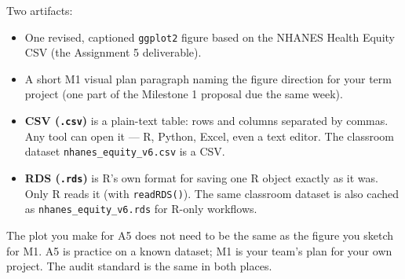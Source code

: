 \documentclass[
  letterpaper,
  DIV=11,
  numbers=noendperiod,
  oneside]{scrreprt}
\providecommand{\tightlist}{%
  \setlength{\itemsep}{0pt}\setlength{\parskip}{0pt}}
\begin{document}
Two artifacts:

\begin{itemize}
\tightlist
\item
  One revised, captioned \texttt{ggplot2} figure based on the NHANES
  Health Equity CSV (the Assignment 5 deliverable).
\item
  A short M1 visual plan paragraph naming the figure direction for your
  term project (one part of the Milestone 1 proposal due the same week).
\end{itemize}

\begin{tcolorbox}[enhanced jigsaw, title=\textcolor{quarto-callout-note-color}{\faInfo}\hspace{0.5em}{Two file formats you will keep seeing: CSV and RDS}, arc=.35mm, toptitle=1mm, colframe=quarto-callout-note-color-frame, toprule=.15mm, leftrule=.75mm, bottomtitle=1mm, opacityback=0, bottomrule=.15mm, coltitle=black, breakable, opacitybacktitle=0.6, titlerule=0mm, colback=white, left=2mm, colbacktitle=quarto-callout-note-color!10!white, rightrule=.15mm]

\begin{itemize}
\tightlist
\item
  \textbf{CSV (\texttt{.csv})} is a plain-text table: rows and columns
  separated by commas. Any tool can open it --- R, Python, Excel, even a
  text editor. The classroom dataset \texttt{nhanes\_equity\_v6.csv} is
  a CSV.
\item
  \textbf{RDS (\texttt{.rds})} is R's own format for saving one R object
  exactly as it was. Only R reads it (with \texttt{readRDS()}). The same
  classroom dataset is also cached as \texttt{nhanes\_equity\_v6.rds}
  for R-only workflows.
\end{itemize}

\end{tcolorbox}

\begin{tcolorbox}[enhanced jigsaw, title=\textcolor{quarto-callout-tip-color}{\faLightbulb}\hspace{0.5em}{Tip}, arc=.35mm, toptitle=1mm, colframe=quarto-callout-tip-color-frame, toprule=.15mm, leftrule=.75mm, bottomtitle=1mm, opacityback=0, bottomrule=.15mm, coltitle=black, breakable, opacitybacktitle=0.6, titlerule=0mm, colback=white, left=2mm, colbacktitle=quarto-callout-tip-color!10!white, rightrule=.15mm]

The plot you make for A5 does not need to be the same as the figure you
sketch for M1. A5 is practice on a known dataset; M1 is your team's plan
for your own project. The audit standard is the same in both places.

\end{tcolorbox}
\end{document}
